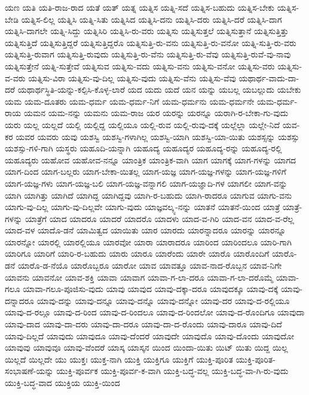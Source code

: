 {ಯಣ
ಯತಿ
ಯತಿ-ರಾಜ-ರಾದ
ಯತೆ
ಯತ್
ಯತ್ನ
ಯತ್ನಿಸ
ಯತ್ನಿ-ಸದೆ
ಯತ್ನಿಸ-ಬಹುದು
ಯತ್ನಿಸ-ಬೇಕು
ಯತ್ನಿಸ-ಬೇಡಿ
ಯತ್ನಿಸ-ಲಿಲ್ಲ
ಯತ್ನಿಸಿ
ಯತ್ನಿ-ಸಿತು
ಯತ್ನಿಸಿದ
ಯತ್ನಿಸಿ-ದನು
ಯತ್ನಿಸಿ-ದರು
ಯತ್ನಿಸಿ-ದರೆ
ಯತ್ನಿಸಿ-ದಾಗ
ಯತ್ನಿಸಿ-ದಾಗಲೇ
ಯತ್ನಿ-ಸಿದ್ದು
ಯತ್ನಿಸಿರಿ
ಯತ್ನಿಸಿ-ರು-ವರು
ಯತ್ನಿಸು
ಯತ್ನಿಸುತ್ತಲೆ
ಯತ್ನಿಸುತ್ತಾನೆ
ಯತ್ನಿಸುತ್ತಿತ್ತು
ಯತ್ನಿಸುತ್ತಿದೆ
ಯತ್ನಿಸುತ್ತಿದ್ದರೆ
ಯತ್ನಿಸುತ್ತಿದ್ದರೊ
ಯತ್ನಿಸುತ್ತಿ-ರು-ವನು
ಯತ್ನಿಸುತ್ತಿ-ರು-ವನೋ
ಯತ್ನಿ-ಸುತ್ತಿ-ರು-ವರು
ಯತ್ನಿಸುತ್ತಿ-ರುವಾಗ
ಯತ್ನಿಸುತ್ತಿ-ರುವುದು
ಯತ್ನಿಸುತ್ತಿ-ರು-ವೆನು
ಯತ್ನಿಸುತ್ತಿ-ರು-ವೆವು
ಯತ್ನಿಸುತ್ತಿ-ರುವೆ-ವು-ನಾವು
ಯತ್ನಿಸುತ್ತೇನೆ
ಯತ್ನಿ-ಸುತ್ತೇವೆ
ಯತ್ನಿಸುವ
ಯತ್ನಿಸು-ವದು
ಯತ್ನಿಸು-ವನು
ಯತ್ನಿಸು-ವನೋ
ಯತ್ನಿಸು-ವರು
ಯತ್ನಿಸು-ವ-ವರು
ಯತ್ನಿಸು-ವಿರಾ
ಯತ್ನಿಸು-ವು-ದಿಲ್ಲ
ಯತ್ನಿಸು-ವುದು
ಯತ್ನಿಸು-ವೆನು
ಯತ್ನಿಸು-ವೆವು
ಯಥಾರ್ಥ-ವಾದು-ದಾ-ದರೆ
ಯಥಾರ್ಥಸ್ಥಿತಿ-ಯನ್ನು-ಕಲ್ಪಿಸಿ-ಕೊಳ್ಳ-ಲಾರೆ
ಯದ
ಯದು
ಯದೆ
ಯನ
ಯನ್ನು
ಯಬಲ್ಲ
ಯಬಲ್ಲುದು
ಯಬೇಕು
ಯಮ
ಯಮ-ದೂತರು
ಯಮ-ಧರ್ಮ
ಯಮ-ಧರ್ಮ-ನಿಗೆ
ಯಮ-ಧರ್ಮನು
ಯಮ-ಧರ್ಮನೇ
ಯಮ-ಧರ್ಮ-ರಾಯ
ಯಮನ
ಯಮ-ನನ್ನು
ಯಮನು
ಯಮ-ರಾಜ
ಯರ
ಯರನ್ನು
ಯರನ್ನೂ
ಯರಾಗಿ-ರ-ಬೇಕಾ-ಗು-ವುದು
ಯರು
ಯಲ್ಲ
ಯಲ್ಲದೆ
ಯಲ್ಲಿ
ಯಲ್ಲಿದ್ದ
ಯಲ್ಲಿಯೂ
ಯಲ್ಲಿ-ರುವ
ಯಲ್ಲಿ-ರುವು-ದಕ್ಕೆ
ಯಲ್ಲೆಲ್ಲಾ
ಯಲ್ಲೇ-ನಿದೆ
ಯವ-ಕರ
ಯವರ
ಯವರು
ಯವು
ಯಶಸ್ವಿ
ಯಶಸ್ವಿ-ಗಳಾಗಿಲ್ಲ
ಯಶಸ್ವಿ-ಯಾಗಿ
ಯಶಸ್ವಿ-ಯಾ-ಯಿತು
ಯಶಸ್ಸನ್ನು
ಯಶಸ್ಸು
ಯಶಸ್ಸು-ಗಳಿ-ಗಾಗಿ
ಯಸ್ಥರು
ಯಹೂದಿ-ಯನ್ನಾಗಿ
ಯಹೂದ್ಯ
ಯಹೂದ್ಯರ
ಯಹೂದ್ಯ-ರನ್ನು
ಯಹೂದ್ಯ-ರಲ್ಲಿ
ಯಹೂದ್ಯರು
ಯಹೋವ
ಯಹೋವ-ನನ್ನೂ
ಯಾಂತ್ರಿಕ
ಯಾಂತ್ರಿಕ-ವಾಗಿ
ಯಾಗ
ಯಾಗಕ್ಕೆ
ಯಾಗ-ಗಳನ್ನು
ಯಾಗದ
ಯಾಗ-ದಿಂದ
ಯಾಗ-ಬಲ್ಲರು
ಯಾಗ-ಬೇಕಾ-ಯಿತಲ್ಲ
ಯಾಗ-ಯಜ್ಞ
ಯಾಗ-ಯಜ್ಞ-ಗಳನ್ನು
ಯಾಗ-ಯಜ್ಞ-ಗಳಿಗೆ
ಯಾಗ-ಯಜ್ಞ-ಗಳು
ಯಾಗ-ಯಜ್ಞ-ಬಲಿ
ಯಾಗ-ಯಜ್ಞ-ವನ್ನಾಗಲಿ
ಯಾಗ-ಯಜ್ಞಾದಿ-ಗಳ
ಯಾಗಲೀ
ಯಾಗ-ವನ್ನು
ಯಾಗಿ
ಯಾಗಿತ್ತು
ಯಾಗಿದೆ
ಯಾಗಿದ್ದ
ಯಾಗಿದ್ದವು
ಯಾಗಿ-ರ-ಬಹುದು
ಯಾಗಿ-ರಾದರೂ
ಯಾಗುವ
ಯಾಗು-ವನು
ಯಾಗು-ವು-ದಿಲ್ಲ
ಯಾಗು-ವು-ದಿಲ್ಲವೇ
ಯಾಗು-ವುದು
ಯಾಜ್ಞವಲ್ಕ್ಯ-ನನ್ನು
ಯಾತನೆ
ಯಾತನೆ-ಯಿಂದ
ಯಾತ್ರೆ
ಯಾತ್ರೆ-ಗಳನ್ನು
ಯಾತ್ರೆಗೆ
ಯಾದ
ಯಾದರೂ
ಯಾದರೆ
ಯಾದರೊ
ಯಾದಳು
ಯಾದ-ವ-ಗಿರಿ
ಯಾದ-ವನ
ಯಾದ-ವ-ರೆಲ್ಲ
ಯಾದ-ವಳ
ಯಾದೊ-ಡನೆ
ಯಾಮಿತ್ವದ
ಯಾಯಿತು
ಯಾರ
ಯಾರದು
ಯಾರನ್ನಾದರೂ
ಯಾರನ್ನು
ಯಾರನ್ನೂ
ಯಾರನ್ನೋ
ಯಾರಲ್ಲಿ
ಯಾರಲ್ಲಿಯೂ
ಯಾರವೋ
ಯಾರಾ
ಯಾರಾದರೂ
ಯಾರಿಂದ
ಯಾರಿಂದಲೂ
ಯಾರಿ-ಗಾಗಿ
ಯಾರಿಗೂ
ಯಾರಿಗೆ
ಯಾರಿ-ರ-ಬಹುದು
ಯಾರು
ಯಾರೂ
ಯಾರೆಂದು
ಯಾರೇ
ಯಾರೊ
ಯಾರೊಂದಿಗೆ
ಯಾರೊ-ಡನೆ
ಯಾರೊ-ಡ-ನೆಯೊ
ಯಾರೊಬ್ಬರೂ
ಯಾರೋ
ಯಾವ
ಯಾವತ್ತೂ
ಯಾವ-ನಾದ-ರೊಬ್ಬನ
ಯಾವ-ನಿಗೇ
ಯಾವನು
ಯಾವನೋ
ಯಾವ-ಶಕ್ತಿ
ಯಾವಾ
ಯಾವಾಗ
ಯಾವಾ-ಗ-ಲಾ-ದರೂ
ಯಾವಾ-ಗ-ಲಾ-ದರೊಮ್ಮೆ
ಯಾವಾ-ಗಲೂ
ಯಾವಾ-ಗಲೂ-ಪೂಜಿಸು-ವುದು
ಯಾವು
ಯಾವುದ
ಯಾವು-ದಕ್ಕಾ-ದರೂ
ಯಾವುದಕ್ಕೂ
ಯಾವು-ದಕ್ಕೆ
ಯಾವು-ದನ್ನಾದರೂ
ಯಾವು-ದನ್ನು
ಯಾವು-ದನ್ನೂ
ಯಾವು-ದನ್ನೊ
ಯಾವು-ದನ್ನೋ
ಯಾವು-ದರ
ಯಾವು-ದ-ರಲ್ಲಿಯೂ
ಯಾವು-ದ-ರಲ್ಲೂ
ಯಾವು-ದ-ರಿಂದ
ಯಾವು-ದ-ರಿಂದಲೂ
ಯಾವು-ದ-ರಿಂದಲೋ
ಯಾವು-ದ-ರೊಂದಿಗೂ
ಯಾವುದಾ
ಯಾವು-ದಾದ
ಯಾವು-ದಾ-ದರು
ಯಾವು-ದಾ-ದರೂ
ಯಾವು-ದಾ-ದ-ರೊಂದು
ಯಾವು-ದಾರೂ
ಯಾವು-ದಿದೆ
ಯಾವು-ದಿಲ್ಲದೆ
ಯಾವುದು
ಯಾವುದೂ
ಯಾವು-ದೆಂದರೆ
ಯಾವುದೇ
ಯಾವುದೊ
ಯಾವು-ದೊಂದು
ಯಾವುದೋ
ಯಾವುವು
ಯಾವುವೂ
ಯಾವು-ವೆಂದರೆ
ಯಾಸ್ಕ
ಯಾಸ್ಕನ
ಯಿಂದ
ಯಿಂದಾ-ಯಿತು
ಯಿಟ್
ಯಿತು
ಯಿದ್ದ
ಯಿಲ್ಲ
ಯಿಲ್ಲದೆ
ಯಿಲ್ಲದೇ
ಯು
ಯುಕ್ತಃ
ಯುಕ್ತ-ನಾಗಿ
ಯುಕ್ತಿ
ಯುಕ್ತಿಗೂ
ಯುಕ್ತಿಗೆ
ಯುಕ್ತಿ-ಪೂರಿತ
ಯುಕ್ತಿ-ಪೂರಿತ-ಸಂಭಾಷಣೆ-ಯನ್ನು
ಯುಕ್ತಿ-ಪೂರ್ವಕ
ಯುಕ್ತಿ-ಪೂರ್ವ-ಕ-ವಾಗಿ
ಯುಕ್ತಿ-ಬದ್ಧ-ವಲ್ಲ
ಯುಕ್ತಿ-ಬದ್ಧ-ವಾ-ಗಿ-ರು-ವುದು
ಯುಕ್ತಿ-ಬದ್ಧ-ವಾದ
ಯುಕ್ತಿಯ
ಯುಕ್ತಿ-ಯಿಂದ
}
